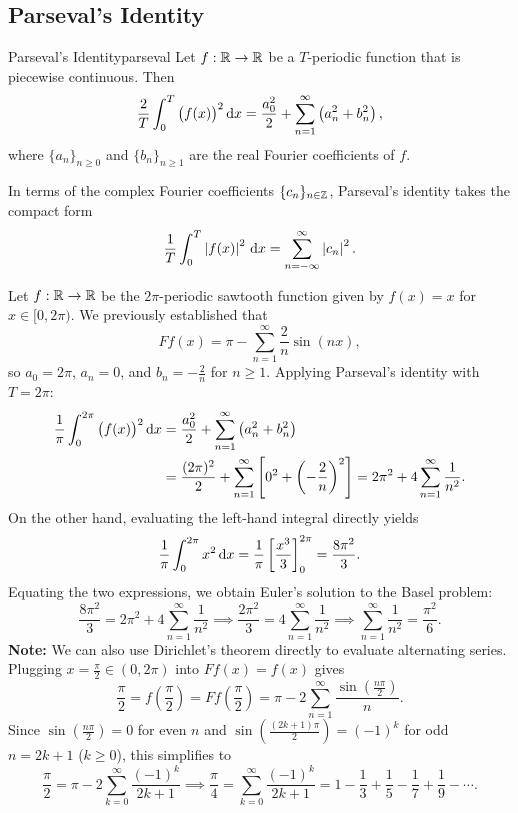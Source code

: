 \subsection{Parseval's Identity}

\begin{theoreme}{Parseval's Identity}{parseval}
    Let $f : \mathbb{R} \to \mathbb{R}$ be a $T$-periodic function that is piecewise continuous. Then
    \[
        \frac{2}{T} \int_{0}^{T} \big(f(x)\big)^2 \,\mathrm{d}x = \frac{a_0^2}{2} + \sum_{n=1}^{\infty} \left(a_n^2 + b_n^2\right),
    \]
    where $\{a_n\}_{n \ge 0}$ and $\{b_n\}_{n \ge 1}$ are the real Fourier coefficients of $f$.
\end{theoreme}

\begin{remarque}
    In terms of the complex Fourier coefficients $\{c_n\}_{n \in \mathbb{Z}}$, Parseval's identity takes the compact form
    \[
        \frac{1}{T} \int_{0}^{T} \left\lvert f(x)\right\rvert^2 \,\mathrm{d}x = \sum_{n=-\infty}^{\infty} \left\lvert c_n\right\rvert^2.
    \]
\end{remarque}

\begin{exemple}
    Let $f : \mathbb{R} \to \mathbb{R}$ be the $2\pi$-periodic sawtooth function given by $f(x) = x$ for $x \in [0, 2\pi)$. We previously established that
    \[
        Ff(x) = \pi - \sum_{n=1}^{\infty} \frac{2}{n} \sin(nx),
    \]
    so $a_0 = 2\pi$, $a_n = 0$, and $b_n = -\frac{2}{n}$ for $n \ge 1$. Applying Parseval's identity with $T = 2\pi$:
    \begin{align*}
        \frac{1}{\pi} \int_{0}^{2\pi} \big(f(x)\big)^2 \,\mathrm{d}x &= \frac{a_0^2}{2} + \sum_{n=1}^{\infty} \left(a_n^2 + b_n^2\right) \\
        &= \frac{(2\pi)^2}{2} + \sum_{n=1}^{\infty} \left[ 0^2 + \left(-\frac{2}{n}\right)^2 \right] = 2\pi^2 + 4 \sum_{n=1}^{\infty} \frac{1}{n^2}.
    \end{align*}
    On the other hand, evaluating the left-hand integral directly yields
    \[
        \frac{1}{\pi} \int_{0}^{2\pi} x^2 \,\mathrm{d}x = \frac{1}{\pi} \left[ \frac{x^3}{3} \right]_{0}^{2\pi} = \frac{8\pi^2}{3}.
    \]
    Equating the two expressions, we obtain Euler's solution to the Basel problem:
    \[
        \frac{8\pi^2}{3} = 2\pi^2 + 4 \sum_{n=1}^{\infty} \frac{1}{n^2} \implies \frac{2\pi^2}{3} = 4 \sum_{n=1}^{\infty} \frac{1}{n^2} \implies \sum_{n=1}^{\infty} \frac{1}{n^2} = \frac{\pi^2}{6}.
    \]
    \textbf{Note:} We can also use Dirichlet's theorem directly to evaluate alternating series. Plugging $x = \frac{\pi}{2} \in (0, 2\pi)$ into $Ff(x) = f(x)$ gives
    \[
        \frac{\pi}{2} = f\left(\frac{\pi}{2}\right) = Ff\left(\frac{\pi}{2}\right) = \pi - 2 \sum_{n=1}^{\infty} \frac{\sin\left(\frac{n\pi}{2}\right)}{n}.
    \]
    Since $\sin\left(\frac{n\pi}{2}\right) = 0$ for even $n$ and $\sin\left(\frac{(2k+1)\pi}{2}\right) = (-1)^k$ for odd $n = 2k+1$ ($k \ge 0$), this simplifies to
    \[
        \frac{\pi}{2} = \pi - 2 \sum_{k=0}^{\infty} \frac{(-1)^k}{2k+1} \implies \frac{\pi}{4} = \sum_{k=0}^{\infty} \frac{(-1)^k}{2k+1} = 1 - \frac{1}{3} + \frac{1}{5} - \frac{1}{7} + \frac{1}{9} - \cdots.
    \]
\end{exemple}

